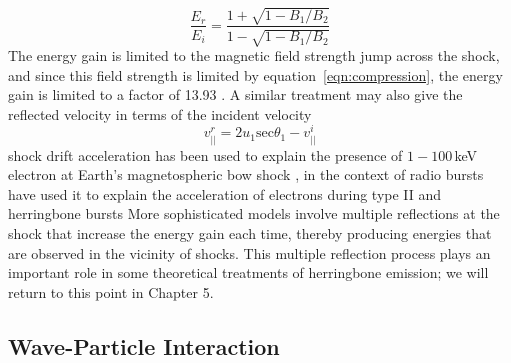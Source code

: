\begin{equation}
\frac{E_r}{E_i} = \frac{1+\sqrt{1-B_1/B_2}}{1-\sqrt{1-B_1/B_2}}
\end{equation}
The energy gain is limited to the magnetic field strength jump across the shock, and since this field strength is limited by equation~\ref{eqn:compression}, the energy gain is limited to a factor of 13.93 \citep{ball2001}. A similar treatment may also give the reflected velocity in terms of the incident velocity \citep{holman1983}
\begin{equation}
v^r_{||} = 2u_1\mathrm{sec}\theta_1 - v^i_{||}
\end{equation}
shock drift acceleration has been used to explain the presence of $1-100$\,keV electron at Earth's magnetospheric bow shock \citep{wu1984}, in the context of radio bursts have used it to explain the acceleration of electrons during type II and herringbone bursts \citep{holman1983, mann2005, schmidt2012b}
More sophisticated models involve multiple reflections at the shock that increase the energy gain each time, thereby producing energies that are observed in the vicinity of shocks. This multiple reflection process plays an important role in some theoretical treatments of herringbone emission; we will return to this point in Chapter 5.



\subsection{Wave-Particle Interaction}\label{sec:wave_particle}


